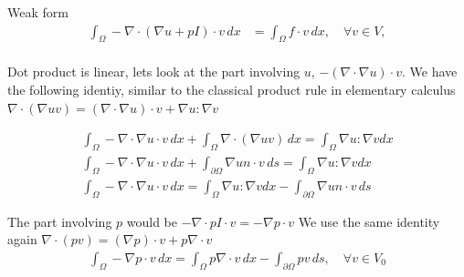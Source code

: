\documentclass[a4paper,12pt]{article}
\theoremstyle{exerciseStyle}
\theoremstyle{solutionStyle}
\begin{document}
\begin{solution}{6.6}
    Weak form
    \begin{align*}
        \int_{\Omega} - \nabla \cdot \left( \nabla u  + p I \right) \cdot v \, dx & = \int_{\Omega} f \cdot v \, dx, \quad \forall v \in V, \\
    \end{align*}

    Dot product is linear, lets look at the part involving \( u \), \( - (\nabla \cdot \nabla u) \cdot v \).
    We have the following identiy, similar to the classical product rule in elementary calculus
    \( \nabla \cdot (\nabla u v) = (\nabla \cdot \nabla u)  \cdot v  + \nabla u  : \nabla v\)

    \begin{align*}
        \int_{\Omega} - \nabla \cdot \nabla u \cdot v \, dx + \int_{\Omega} \nabla \cdot ( \nabla u v)  \, dx = \int_{\Omega} \nabla u : \nabla v dx  \\
        \int_{\Omega} - \nabla \cdot \nabla u \cdot v \, dx + \int_{\partial \Omega} \nabla un  \cdot v  \, ds = \int_{\Omega} \nabla u : \nabla v dx \\
        \int_{\Omega} - \nabla \cdot \nabla u \cdot v \, dx  = \int_{\Omega} \nabla u : \nabla v dx - \int_{\partial \Omega} \nabla u n \cdot v  \, ds
    \end{align*}


    The part involving \(p \) would be \( - \nabla \cdot pI \cdot v = - \nabla p  \cdot v \)
    We use the same identity again \( \nabla \cdot (p v) = (\nabla p) \cdot v + p  \nabla \cdot v\)
    \begin{align*}
        \int_{\Omega} - \nabla p \cdot v \, dx = \int_{\Omega} p \nabla \cdot v \, dx - \int_{\partial \Omega} p v \, ds, \quad \forall v \in V_0
    \end{align*}


\end{solution}
\end{document}
